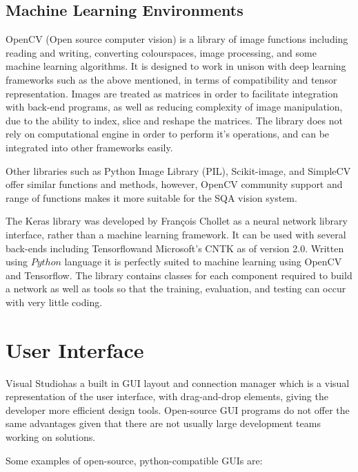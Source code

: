 \documentclass[fleqn,twoside,12pt]{report}
\begin{document}
\subsection{Machine Learning Environments}



OpenCV (Open source computer vision) is a library of image functions including reading and writing, converting colourspaces, image processing, and some machine learning algorithms. It is designed to work in unison with deep learning frameworks such as the above mentioned, in terms of compatibility and tensor representation. Images are treated as matrices in order to facilitate integration with back-end programs, as well as reducing complexity of image manipulation, due to the ability to index, slice and reshape the matrices. The library does not rely on computational engine in order to perform it's operations, and can be integrated into other frameworks easily.

Other libraries such as Python Image Library (PIL), Scikit-image, and SimpleCV offer similar functions and methods, however, OpenCV community support and range of functions makes it more suitable for the SQA vision system.

The Keras library was developed by François Chollet as a neural network library interface, rather than a machine learning framework. It can be used with several back-ends including Tensorflow\textregistered and Microsoft\textregistered's CNTK as of version 2.0. Written using $Python$ language it is perfectly suited to machine learning using OpenCV and Tensorflow\textregistered. The library contains classes for each component required to build a network as well as tools so that the training, evaluation, and testing can occur with very little coding.





\section{User Interface}


Visual Studio\textregistered has a built in GUI layout and connection manager which is a visual representation of the user interface, with drag-and-drop elements, giving the developer more efficient design tools. Open-source GUI programs do not offer the same advantages given that there are not usually large development teams working on solutions. 

Some examples of open-source, python-compatible GUIs are:
\end{document}
